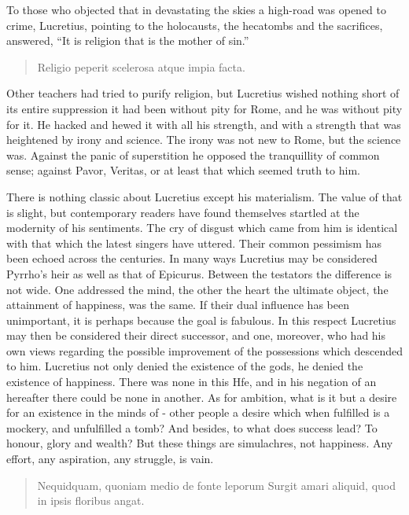 \documentclass[]{book}
\begin{document}
To those who objected that in devastating the skies a high-road was
opened to crime, Lucretius, pointing to the holocausts, the hecatombs
and the sacrifices, answered, ``It is religion that is the mother of
sin.''

\begin{quote}
Religio peperit scelerosa atque impia facta.
\end{quote}

Other teachers had tried to purify religion, but Lucretius wished
nothing short of its entire suppression it had been without pity for
Rome, and he was without pity for it. He hacked and hewed it with all
his strength, and with a strength that was heightened by irony and
science. The irony was not new to Rome, but the science was. Against the
panic of superstition he opposed the tranquillity of common sense;
against Pavor, Veritas, or at least that which seemed truth to him.

There is nothing classic about Lucretius except his materialism. The
value of that is slight, but contemporary readers have found themselves
startled at the modernity of his sentiments. The cry of disgust which
came from him is identical with that which the latest singers have
uttered. Their common pessimism has been echoed across the centuries. In
many ways Lucretius may be considered Pyrrho's heir as well as that of
Epicurus. Between the testators the difference is not wide. One
addressed the mind, the other the heart the ultimate object, the
attainment of happiness, was the same. If their dual influence has been
unimportant, it is perhaps because the goal is fabulous. In this respect
Lucretius may then be considered their direct successor, and one,
moreover, who had his own views regarding the possible improvement of
the possessions which descended to him. Lucretius not only denied the
existence of the gods, he denied the existence of happiness. There was
none in this Hfe, and in his negation of an hereafter there could be
none in another. As for ambition, what is it but a desire for an
existence in the minds of - other people a desire which when fulfilled
is a mockery, and unfulfilled a tomb? And besides, to what does success
lead? To honour, glory and wealth? But these things are simulachres, not
happiness. Any effort, any aspiration, any struggle, is vain.

\begin{quote}
Nequidquam, quoniam medio de fonte leporum Surgit amari aliquid, quod in
ipsis floribus angat.
\end{quote}
\end{document}
